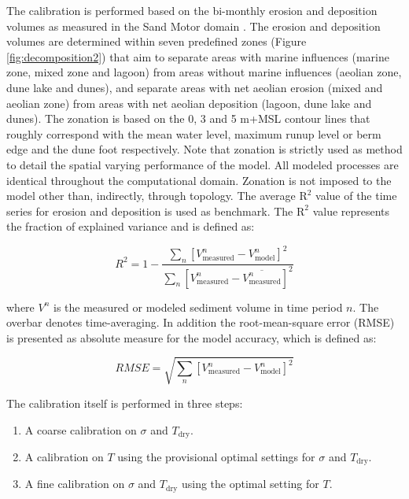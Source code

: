 The calibration is performed based on the bi-monthly erosion and
deposition volumes as measured in the Sand Motor domain
\citep{Hoonhout2017a}. The erosion and deposition volumes are
determined within seven predefined zones (Figure
\ref{fig:decomposition2}) that aim to separate areas with marine
influences (marine zone, mixed zone and lagoon) from areas without
marine influences (aeolian zone, dune lake and dunes), and separate
areas with net aeolian erosion (mixed and aeolian zone) from areas
with net aeolian deposition (lagoon, dune lake and dunes). The
zonation is based on the 0, 3 and 5 m+MSL contour lines that roughly
correspond with the mean water level, maximum runup level or berm edge
and the dune foot respectively. Note that zonation is strictly used as
method to detail the spatial varying performance of the model. All
modeled processes are identical throughout the computational
domain. Zonation is not imposed to the model other than, indirectly,
through topology. The average $\mathrm{R^2}$ value of the time series
for erosion and deposition is used as benchmark. The $\mathrm{R^2}$
value represents the fraction of explained variance and is defined as:

\begin{equation}
  \label{eq:r2}
  R^2 = 1 - \frac{\sum_n \left[ V^n_{\mathrm{measured}} - V^n_{\mathrm{model}} \right]^2}{\sum_n \left[ V^n_{\mathrm{measured}} - \overline{V^n_{\mathrm{measured}}} \right]^2}
\end{equation}

\noindent where $V^n$ is the measured or modeled sediment volume in
time period $n$. The overbar denotes time-averaging. In addition the
root-mean-square error (RMSE) is presented as absolute measure for the
model accuracy, which is defined as:

\begin{equation}
  \label{eq:rmse}
  RMSE = \sqrt{\sum_n \left[ V^n_{\mathrm{measured}} - V^n_{\mathrm{model}} \right]^2}
\end{equation}

\noindent The calibration itself is performed in three steps:

\begin{enumerate}
\item A coarse calibration on $\sigma$ and $T_{\mathrm{dry}}$.
\item A calibration on $T$ using the provisional optimal settings for
  $\sigma$ and $T_{\mathrm{dry}}$.
\item A fine calibration on $\sigma$ and $T_{\mathrm{dry}}$ using the
  optimal setting for $T$.
\end{enumerate}

